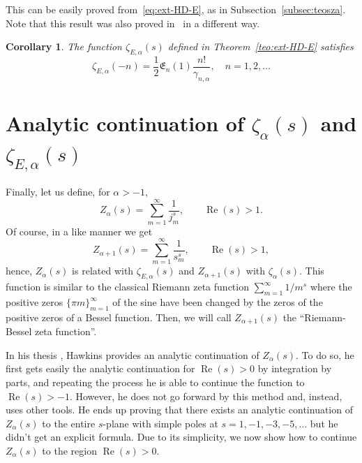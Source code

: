 \documentclass[a4paper]{amsart}
\newcommand{\E}{\mathfrak{E}}
\renewcommand{\Re}{\operatorname{Re}}
\theoremstyle{plain}
\newtheorem{corollary}[theorem]{Corollary}
\theoremstyle{definition}
\theoremstyle{remark}
\numberwithin{equation}{section}
\begin{document}
This can be easily proved from~\eqref{eq:ext-HD-E}, as in Subsection~\ref{subsec:teosza}.
Note that this result was also proved in~\cite{DPV} in a different way.

\begin{corollary}
The function $\zeta_{E,\alpha}(s)$ defined in Theorem~\ref{teo:ext-HD-E} satisfies
\begin{equation*}
\zeta_{E,\alpha}(-n) = \frac{1}{2}\E_{n}(1)\frac{n!}{\gamma_{n,\alpha}},
\quad n=1,2,\dots
\end{equation*}
\end{corollary}

\section{Analytic continuation of $\zeta_\alpha(s)$ and  $\zeta_{E,\alpha}(s)$}
\label{sec:zetaR}

Finally, let us define, for $\alpha>-1$,
\begin{equation}
\label{eq:zetaR}
  Z_{\alpha}(s) = \sum_{m=1}^{\infty} \frac{1}{j_m^{s}},
  \qquad \Re(s) > 1.
\end{equation}
Of course, in a like manner we get
\begin{equation*}
  Z_{\alpha+1}(s) = \sum_{m=1}^{\infty} \frac{1}{s_m^{s}},
  \qquad \Re(s) > 1,
\end{equation*}
hence, $Z_{\alpha}(s)$ is related with $\zeta_{E,\alpha}(s)$ and $Z_{\alpha+1}(s)$ with $\zeta_{\alpha}(s)$. This function is similar to the classical Riemann zeta function $\sum_{m=1}^{\infty} 1/m^s$ where the positive zeros $\{\pi m\}_{m=1}^{\infty}$ of the sine have been changed by the zeros of the positive zeros of a Bessel function. Then, we will call $Z_{\alpha+1}(s)$ the ``Riemann-Bessel zeta function''.

In his thesis \cite{Haw}, Hawkins provides an analytic continuation of $Z_{\alpha}(s)$. To do so, he first gets easily the analytic continuation for $\Re(s)>0$ by integration by parts, and repeating the process he is able to continue the function to $\Re(s)>-1$. However, he does not go forward by this method and, instead, uses other tools. He ends up proving that there exists an analytic continuation of $Z_{\alpha}(s)$ to the entire $s$-plane with simple poles at $s=1,-1,-3,-5,\dots$ but he didn't get an explicit formula. Due to its simplicity, we now show how to continue $Z_{\alpha}(s)$ to the region $\Re(s)>0$.
\end{document}
